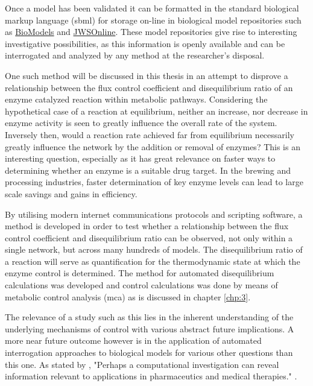 Once a model has been validated it can be formatted in the standard biological markup language (\gls{sbml}) for storage on-line in biological model repositories such as \href{https://www.ebi.ac.uk/biomodels-main/}{BioModels} and \href{https://jjj.bio.vu.nl}{JWSOnline}. These model repositories give rise to interesting investigative possibilities, as this information is openly available and can be interrogated and analyzed by any method at the researcher's disposal. 

One such method will be discussed in this thesis in an attempt to disprove a relationship between the flux control coefficient and disequilibrium ratio of an enzyme catalyzed reaction within metabolic pathways. Considering the hypothetical case of a reaction at equilibrium, neither an increase, nor decrease in enzyme activity is seen to greatly influence the overall rate of the system. Inversely then, would a reaction rate achieved far from equilibrium necessarily greatly influence the network by the addition or removal of enzymes? This is an interesting question, especially as it has great relevance on faster ways to determining whether an enzyme is a suitable drug target. In the brewing and processing industries, faster determination of key enzyme levels can lead to large scale savings and gains in efficiency. 

By utilising modern internet communications protocols and scripting software, a method is developed in order to test whether a relationship between the flux control coefficient and disequilibrium ratio can be observed, not only within a single network, but across many hundreds of models. The disequilibrium ratio of a reaction will serve as quantification for the thermodynamic state at which the enzyme control is determined. The method for automated disequilibrium calculations was developed and control calculations was done by means of metabolic control analysis (\gls{mca}) as is discussed in chapter \ref{chp:3}. 

The relevance of a study such as this lies in the inherent understanding of the underlying mechanisms of control with various abstract future implications. A more near future outcome however is in the application of automated interrogation approaches to biological models for various other questions than this one. As stated by \citeauthor{Knudsen2004}, "Perhaps a computational investigation can reveal information relevant to applications in pharmaceutics and medical therapies." \cite{Knudsen2004}.

 

